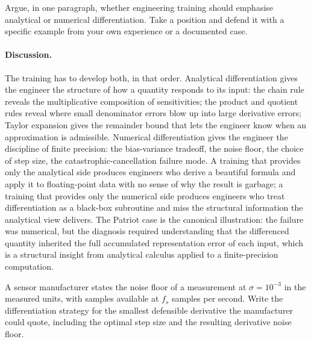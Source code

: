 \begin{exercise}
Argue, in one paragraph, whether engineering training should
emphasise analytical or numerical differentiation. Take a
position and defend it with a specific example from your own
experience or a documented case.
\end{exercise}

\paragraph{Discussion.}
The training has to develop both, in that order. Analytical
differentiation gives the engineer the structure of how a
quantity responds to its input: the chain rule reveals the
multiplicative composition of sensitivities; the product and
quotient rules reveal where small denominator errors blow up
into large derivative errors; Taylor expansion gives the
remainder bound that lets the engineer know when an
approximation is admissible. Numerical differentiation gives the
engineer the discipline of finite precision: the bias-variance
tradeoff, the noise floor, the choice of step size, the
catastrophic-cancellation failure mode. A training that provides
only the analytical side produces engineers who derive a
beautiful formula and apply it to floating-point data with no
sense of why the result is garbage; a training that provides
only the numerical side produces engineers who treat
differentiation as a black-box subroutine and miss the
structural information the analytical view delivers. The Patriot
case is the canonical illustration: the failure was numerical,
but the diagnosis required understanding that the differenced
quantity inherited the full accumulated representation error of
each input, which is a structural insight from analytical
calculus applied to a finite-precision computation.

\begin{exercise}
A sensor manufacturer states the noise floor of a measurement at
$\sigma = 10^{-3}$ in the measured units, with samples available
at $f_{s}$ samples per second. Write the differentiation strategy
for the smallest defensible derivative the manufacturer could
quote, including the optimal step size and the resulting
derivative noise floor.
\end{exercise}

